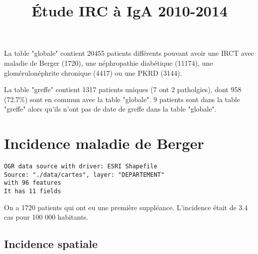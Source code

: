 \documentclass[11pt,a4paper]{article}\usepackage[]{graphicx}\usepackage[]{color}
\title{Étude IRC à IgA 2010-2014}
\makeatletter
\newenvironment{kframe}{%
 \def\at@end@of@kframe{}%
 \ifinner\ifhmode%
  \def\at@end@of@kframe{\end{minipage}}%
  \begin{minipage}{\columnwidth}%
 \fi\fi%
 \def\FrameCommand##1{\hskip\@totalleftmargin \hskip-\fboxsep
 \colorbox{shadecolor}{##1}\hskip-\fboxsep
     \hskip-\linewidth \hskip-\@totalleftmargin \hskip\columnwidth}%
 \MakeFramed {\advance\hsize-\width
   \@totalleftmargin\z@ \linewidth\hsize
   \@setminipage}}%
 {\par\unskip\endMakeFramed%
 \at@end@of@kframe}
\newenvironment{knitrout}{}{} %
\makeatother
\begin{document}
\maketitle





La table "globale" contient 20455 patients différents pouvant avoir une IRCT avec maladie de Berger (1720), une néphropathie diabétique (11174), une glomérulonéphrite chronique (4417) ou une PKRD (3144).

La table "greffe" contient 1317 patients uniques (7 ont 2 patholgies), dont 958 (72.7\%) sont en commun avec la table "globale". 9 patients sont dans la table "greffe" alors qu'ils n'ont pas de date de greffe dans la table "globale".

\section{Incidence maladie de Berger}
\begin{knitrout}
\color{fgcolor}\begin{kframe}
\begin{verbatim}
OGR data source with driver: ESRI Shapefile 
Source: "./data/cartes", layer: "DEPARTEMENT"
with 96 features
It has 11 fields
\end{verbatim}
\end{kframe}
\end{knitrout}
On a 1720 patients qui ont eu une première suppléance. L'incidence était de 3.4 cas pour 100 000 habitants.

  \subsection{Incidence spatiale}
\end{document}
